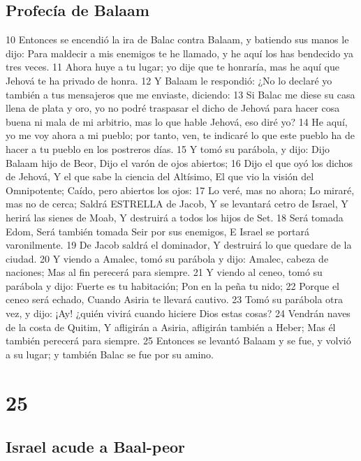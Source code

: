 \section*{Profecía de Balaam}

10 Entonces se encendió la ira de Balac contra Balaam, y batiendo sus manos le dijo: Para maldecir a mis enemigos te he llamado, y he aquí los has bendecido ya tres veces.
11 Ahora huye a tu lugar; yo dije que te honraría, mas he aquí que Jehová te ha privado de honra.
12 Y Balaam le respondió: ¿No lo declaré yo también a tus mensajeros que me enviaste, diciendo:
13 Si Balac me diese su casa llena de plata y oro, yo no podré traspasar el dicho de Jehová para hacer cosa buena ni mala de mi arbitrio, mas lo que hable Jehová, eso diré yo?
14 He aquí, yo me voy ahora a mi pueblo; por tanto, ven, te indicaré lo que este pueblo ha de hacer a tu pueblo en los postreros días.
15 Y tomó su parábola, y dijo:
Dijo Balaam hijo de Beor,
Dijo el varón de ojos abiertos;
16 Dijo el que oyó los dichos de Jehová,
Y el que sabe la ciencia del Altísimo,
El que vio la visión del Omnipotente;
Caído, pero abiertos los ojos:
17 Lo veré, mas no ahora;
Lo miraré, mas no de cerca;
Saldrá ESTRELLA de Jacob,
Y se levantará cetro de Israel,
Y herirá las sienes de Moab,
Y destruirá a todos los hijos de Set.
18 Será tomada Edom,
Será también tomada Seir por sus enemigos,
E Israel se portará varonilmente.
19 De Jacob saldrá el dominador,
Y destruirá lo que quedare de la ciudad.
20 Y viendo a Amalec, tomó su parábola y dijo: 
Amalec, cabeza de naciones; 
Mas al fin perecerá para siempre. 
21 Y viendo al ceneo, tomó su parábola y dijo: 
Fuerte es tu habitación; 
Pon en la peña tu nido; 
22 Porque el ceneo será echado, 
Cuando Asiria te llevará cautivo. 
23 Tomó su parábola otra vez, y dijo: 
¡Ay! ¿quién vivirá cuando hiciere Dios estas cosas? 
24 Vendrán naves de la costa de Quitim, 
Y afligirán a Asiria, afligirán también a Heber; 
Mas él también perecerá para siempre. 
25 Entonces se levantó Balaam y se fue, 
y volvió a su lugar; y también Balac se fue por su amino.

\chapter{25}

\section*{Israel acude a Baal-peor }


